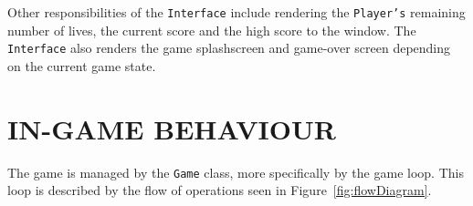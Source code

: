 \documentclass[10pt,twocolumn]{witseiepaper}
\begin{document}
Other responsibilities of the \texttt{Interface} include rendering the \texttt{Player's} remaining number of lives, the current score and the high score to the window. The \texttt{Interface} also renders the game splashscreen and game-over screen depending on the current game state.

\section{IN-GAME BEHAVIOUR}

The game is managed by the \texttt{Game} class, more specifically by the game loop. This loop is described by the flow of operations seen in Figure~\ref{fig:flowDiagram}. 

\begin{figure}[H]
	\centering

\end{figure}
\end{document}
